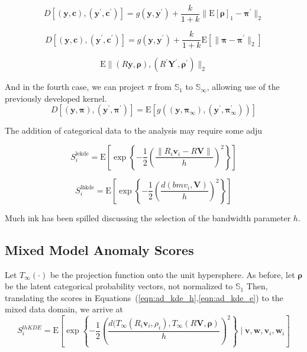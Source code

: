   \[
    D\left[(\bm{y},\bm{c}), (\bm{y}^{\prime}, \bm{c}^{\prime})\right] = 
      g(\bm{y},\bm{y}^{\prime}) + 
          \frac{k}{1 + k}\lVert \text{E}[\bm{\rho}]_1 - \bm{\pi}^{\prime}\rVert_2
  \]
  
  \begin{equation*}
    D\left[(\bm{y},\bm{c}), (\bm{y}^{\prime}, \bm{c}^{\prime})\right] = 
      g(\bm{y},\bm{y}^{\prime}) + 
        \frac{k}{1 + k}\text{E}\left[\lVert \bm{\pi} - \bm{\pi}^{\prime}\rVert_2\right]
  \end{equation*}

  \[
    \text{E}\lVert (R\bm{y},\bm{\rho}), (R^\prime\bm{Y}^\prime,\bm{\rho}^\prime)\rVert_2
  \]


And in the fourth case, we can project $\pi$ from $\mathbb{S}_1$ to 
  $\mathbb{S}_{\infty}$, allowing use of the previously developed kernel.
  \begin{equation*}
    D\left[(\bm{y},\bm{\pi}), (\bm{y}^{\prime}, \bm{\pi}^{\prime})\right] = 
      \text{E}\left[ g\left((\bm{y},\bm{\pi}_{\infty}), 
            (\bm{y}^{\prime},\bm{\pi}_{\infty}^{\prime})\right)\right]
  \end{equation*}

The addition of categorical data to the analysis may require some adju

\begin{equation*}
  S_i^{\text{lekde}} = 
  \text{E}\left[\exp\left\lbrace-\frac{1}{2}\left(\frac{\lVert R_i\bm{v}_i - R\bm{V}\rVert}{h}\right)^2\right\rbrace\right]
\end{equation*}

\begin{equation*}
  S_i^{\text{lhkde}} = 
  \text{E}\left[ \exp\left\lbrace-\frac{1}{2}\left(\frac{d(bm{v}_i,\bm{V})}{h}\right)^2\right\rbrace\right]
\end{equation*}

Much ink has been spilled discussing the selection of the bandwidth parameter $h$.

\subsection{Mixed Model Anomaly Scores}
Let $T_{\infty}(\cdot)$ be the projection function onto the unit hypersphere.  As before, let $\bm{\rho}$ be the latent categorical probability vectors, not normalized to $\mathbb{S}_1$  Then, translating the scores in Equations~(\ref{eqn:ad_kde_h},\ref{eqn:ad_kde_e}) to the mixed data domain, we arrive at
\begin{equation}
    \label{eqn:ad_kde_mhl}
    S_i^{lhKDE} = \text{E}\left[
    \exp\left\lbrace
    -\frac{1}{2}\left(
    \frac{d(T_{\infty}(R_i\bm{v}_i,\rho_i), T_{\infty}(R\bm{V},\bm{\rho})}{h}
    \right)^2
    \right\rbrace 
    \mid \bm{v},\bm{w},\bm{v}_i, \bm{w}_i\right]
\end{equation}

